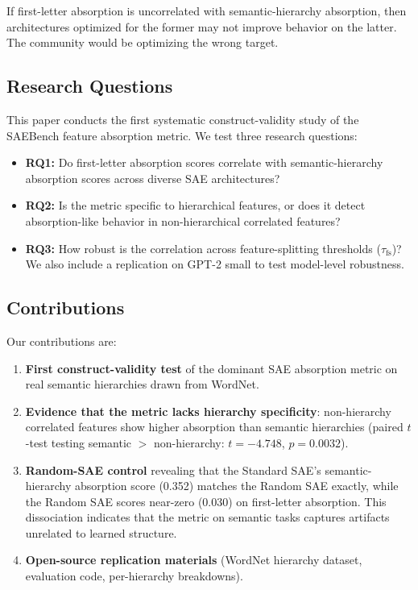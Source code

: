 \documentclass{article}
\begin{document}
If first-letter absorption is uncorrelated with semantic-hierarchy absorption, then architectures optimized for the former may not improve behavior on the latter. The community would be optimizing the wrong target.

\subsection{Research Questions}

This paper conducts the first systematic construct-validity study of the SAEBench feature absorption metric. We test three research questions:

\begin{itemize}
  \item \textbf{RQ1:} Do first-letter absorption scores correlate with semantic-hierarchy absorption scores across diverse SAE architectures?
  \item \textbf{RQ2:} Is the metric specific to hierarchical features, or does it detect absorption-like behavior in non-hierarchical correlated features?
  \item \textbf{RQ3:} How robust is the correlation across feature-splitting thresholds ($\tau_{\text{fs}}$)? We also include a replication on GPT-2 small to test model-level robustness.
\end{itemize}

\subsection{Contributions}

Our contributions are:

\begin{enumerate}
  \item \textbf{First construct-validity test} of the dominant SAE absorption metric on real semantic hierarchies drawn from WordNet.
  \item \textbf{Evidence that the metric lacks hierarchy specificity}: non-hierarchy correlated features show higher absorption than semantic hierarchies (paired $t$-test testing semantic $>$ non-hierarchy: $t = -4.748$, $p = 0.0032$).
  \item \textbf{Random-SAE control} revealing that the Standard SAE's semantic-hierarchy absorption score (0.352) matches the Random SAE exactly, while the Random SAE scores near-zero (0.030) on first-letter absorption. This dissociation indicates that the metric on semantic tasks captures artifacts unrelated to learned structure.
  \item \textbf{Open-source replication materials} (WordNet hierarchy dataset, evaluation code, per-hierarchy breakdowns).
\end{enumerate}
\end{document}
